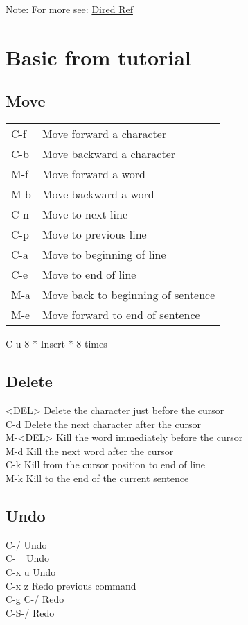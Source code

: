\documentclass[11pt]{article}
\begin{document}
Note: For more see: \href{dired-ref.pdf}{Dired Ref}\\

\section{Basic from tutorial}
\label{sec:orge4abc7f}
\subsection{Move}
\label{sec:orgf603350}
\begin{center}
\begin{tabular}{ll}
\hline
C-f & Move forward a character\\
C-b & Move backward a character\\
M-f & Move forward a word\\
M-b & Move backward a word\\
C-n & Move to next line\\
C-p & Move to previous line\\
C-a & Move to beginning of line\\
C-e & Move to end of line\\
M-a & Move back to beginning of sentence\\
M-e & Move forward to end of sentence\\
\end{tabular}
\end{center}

C-u 8 *  Insert * 8 times\\
\subsection{Delete}
\label{sec:org8525b03}
<DEL>        Delete the character just before the cursor\\
C-d   	     Delete the next character after the cursor\\

M-<DEL>      Kill the word immediately before the cursor\\
M-d	     Kill the next word after the cursor\\

C-k	     Kill from the cursor position to end of line\\
M-k	     Kill to the end of the current sentence\\
\subsection{Undo}
\label{sec:org992d502}
C-/          Undo\\
C-\_          Undo\\
C-x u        Undo\\
C-x z        Redo previous command\\
C-g C-/      Redo\\
C-S-/        Redo\\
\end{document}
